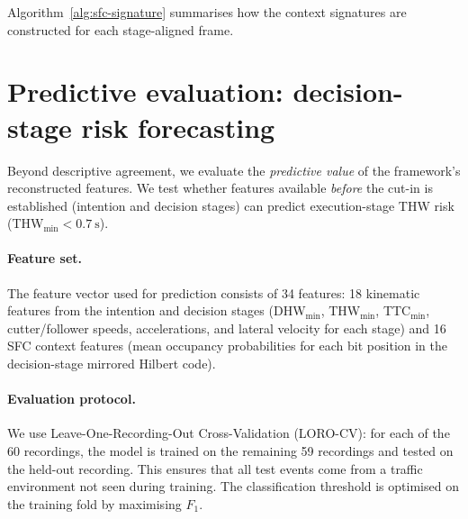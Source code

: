 \documentclass[12pt,a4paper,twoside,openright]{report}
\begin{document}
    Algorithm~\ref{alg:sfc-signature} summarises how the context signatures are constructed for each stage-aligned frame.

    \begin{algorithm}[b]
\caption{Cutter-centred occupancy grid and space-filling-curve context signature}
\label{alg:sfc-signature}

    \end{algorithm}

    \section{Predictive evaluation: decision-stage risk forecasting}
    \label{sec:risk-prediction-method}
    Beyond descriptive agreement, we evaluate the \emph{predictive value} of the framework's reconstructed features. We test whether features available \emph{before} the cut-in is established (intention and decision stages) can predict execution-stage THW risk (THW$_{\min} < \SI{0.7}{\second}$).

    \paragraph{Feature set.}
    The feature vector used for prediction consists of 34 features: 18 kinematic features from the intention and decision stages (DHW$_{\min}$, THW$_{\min}$, TTC$_{\min}$, cutter/follower speeds, accelerations, and lateral velocity for each stage) and 16 SFC context features (mean occupancy probabilities for each bit position in the decision-stage mirrored Hilbert code).

    \paragraph{Evaluation protocol.}
    We use Leave-One-Recording-Out Cross-Validation (LORO-CV): for each of the 60 recordings, the model is trained on the remaining 59 recordings and tested on the held-out recording. This ensures that all test events come from a traffic environment not seen during training. The classification threshold is optimised on the training fold by maximising $F_1$.
\end{document}

